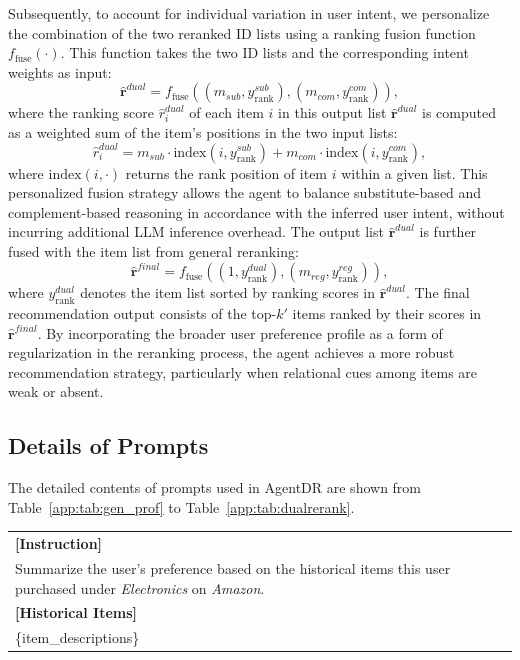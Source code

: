 Subsequently, to account for individual variation in user intent, we personalize the combination of the two reranked ID lists using a ranking fusion function $f_{\text{fuse}}(\cdot)$. This function takes the two ID lists and the corresponding intent weights as input:
\begin{equation}\label{eq_agentdr:fuse}
    \hat{\mathbf{r}}^{dual} = f_{\text{fuse}}((m_{sub}, y_{\text{rank}}^{sub}), ( m_{com}, y_{\text{rank}}^{com})),
\end{equation}
where the ranking score $\hat{r}_{i}^{dual}$ of each item $i$ in this output list $\hat{\mathbf{r}}^{dual}$ is computed as a weighted sum of the item's positions in the two input lists:
\begin{equation}
    \hat{r}_{i}^{dual} = m_{sub}\cdot\text{index}(i, y_{\text{rank}}^{sub}) + m_{com}\cdot\text{index}(i, y_{\text{rank}}^{com}), 
\end{equation}
where $\text{index}(i,\cdot)$ returns the rank position of item $i$ within a given list. This personalized fusion strategy allows the agent to balance substitute-based and complement-based reasoning in accordance with the inferred user intent, without incurring additional LLM inference overhead.
The output list $\hat{\mathbf{r}}^{dual}$ is further fused with the item list from general reranking:
\begin{equation}\label{eq_agentdr:regfuse}
    \hat{\mathbf{r}}^{final} = f_{\text{fuse}}((1, y_{\text{rank}}^{dual}), (m_{reg}, y_{\text{rank}}^{reg})),
\end{equation}
where $y_{\text{rank}}^{dual}$ denotes the item list sorted by ranking scores in $\hat{\mathbf{r}}^{dual}$. The final recommendation output consists of the top-$k'$ items ranked by their scores in $\hat{\mathbf{r}}^{final}$. By incorporating the broader user preference profile as a form of regularization in the reranking process, the agent achieves a more robust recommendation strategy, particularly when relational cues among items are weak or absent.


\subsection{Details of Prompts}\label{app:prompts} 
The detailed contents of prompts used in AgentDR are shown from Table~\ref{app:tab:gen_prof} to Table~\ref{app:tab:dualrerank}. 

\begin{promptbox}
\small
\begin{tabularx}{\linewidth}{X}
\toprule
\textbf{[Instruction]}\\
Summarize the user's preference based on the historical items this user purchased under \emph{Electronics} on \emph{Amazon}.\\[0.4em]
\textbf{[Historical Items]}\\
\{item\_descriptions\}\\
\bottomrule
\end{tabularx}
\end{promptbox}
\label{app:tab:gen_prof}

